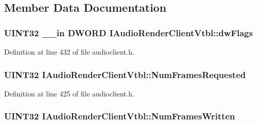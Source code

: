 \subsection{Member Data Documentation}
\subsubsection[{\texorpdfstring{dw\+Flags}{dwFlags}}]{ U\+I\+N\+T32 {\bf \+\_\+\+\_\+in} {\bf D\+W\+O\+RD} I\+Audio\+Render\+Client\+Vtbl\+::dw\+Flags}\hypertarget{struct_i_audio_render_client_vtbl_acc37ce168c6676a42e89ca35de6472e5}{}\label{struct_i_audio_render_client_vtbl_acc37ce168c6676a42e89ca35de6472e5}


Definition at line 432 of file audioclient.\+h.

\subsubsection[{\texorpdfstring{Num\+Frames\+Requested}{NumFramesRequested}}]{ U\+I\+N\+T32 I\+Audio\+Render\+Client\+Vtbl\+::\+Num\+Frames\+Requested}\hypertarget{struct_i_audio_render_client_vtbl_afd9e82dcd5c05fbb72b34fdabb624910}{}\label{struct_i_audio_render_client_vtbl_afd9e82dcd5c05fbb72b34fdabb624910}


Definition at line 425 of file audioclient.\+h.

\subsubsection[{\texorpdfstring{Num\+Frames\+Written}{NumFramesWritten}}]{ U\+I\+N\+T32 I\+Audio\+Render\+Client\+Vtbl\+::\+Num\+Frames\+Written}\hypertarget{struct_i_audio_render_client_vtbl_ae9ddd5d44bae4c0b873e4d2bc2e8c357}{}\label{struct_i_audio_render_client_vtbl_ae9ddd5d44bae4c0b873e4d2bc2e8c357}


